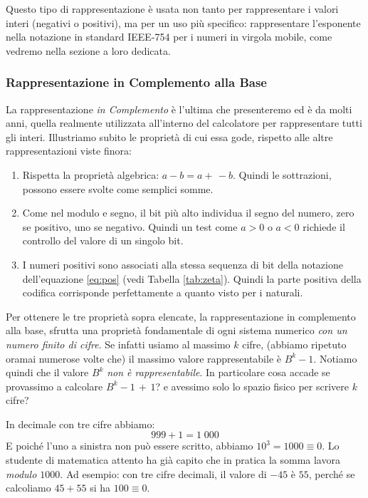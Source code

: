 Questo tipo di rappresentazione è usata non tanto per rappresentare i valori interi (negativi o positivi), ma per un uso più specifico: rappresentare l'esponente nella notazione in standard \textrm{IEEE-754} per i numeri in virgola mobile, come vedremo nella sezione a loro dedicata.

\subsubsection{Rappresentazione in Complemento alla Base}


La rappresentazione \emph{in Complemento} è l'ultima che presenteremo ed è da molti anni, quella realmente utilizzata all'interno del calcolatore per
rappresentare tutti gli interi. Illustriamo subito le proprietà
di cui essa gode, rispetto alle altre rappresentazioni viste finora:
\begin{enumerate}
	\item Rispetta la proprietà algebrica:  $a - b = a +\, -b$. Quindi le sottrazioni, possono essere svolte come semplici somme.
	\item Come nel modulo e segno, il bit più alto individua il segno del numero, zero se positivo, uno se negativo. Quindi un test come $a > 0$ o $a < 0$
	richiede il controllo del valore di un singolo bit.
	\item I numeri positivi sono associati alla stessa sequenza di bit della notazione dell'equazione \eqref{eq:pos} (vedi Tabella \ref{tab:zeta}). Quindi la parte positiva della
	codifica corrisponde perfettamente a quanto visto per i naturali.
\end{enumerate}

Per ottenere le tre proprietà sopra elencate, la
rappresentazione in complemento alla base, sfrutta una proprietà fondamentale
di ogni sistema numerico \emph{con un numero finito di cifre}. Se infatti usiamo al massimo $k$ cifre, (abbiamo ripetuto oramai numerose volte che) il massimo valore rappresentabile è $B^k-1$. Notiamo quindi che il valore
$B^k$ \emph{non è rappresentabile}. In particolare cosa accade se provassimo a calcolare $B^k-1\,+\,1$? e avessimo solo lo spazio fisico per scrivere $k$ cifre?

\begin{ex} In decimale con tre cifre abbiamo:
	\[ \boxed{9}\boxed{9}\boxed{9} + 1 = 1\;\boxed{0}\boxed{0}\boxed{0} \]
E poiché l'uno a sinistra non può essere scritto, abbiamo $10^3 = 1000 \equiv 0$. Lo studente di matematica attento ha già capito che in pratica la somma lavora \emph{modulo $1000$}. Ad esempio: con tre cifre decimali, il valore di $-45$ è $55$, perché se calcoliamo $45 + 55$ si ha $100 \equiv 0$.
\end{ex}


